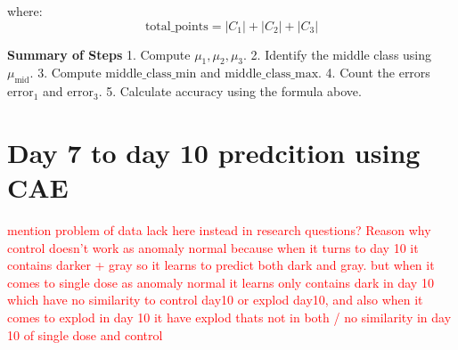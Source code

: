 where:
\[
\text{total\_points} = |C_1| + |C_2| + |C_3|
\]

\textbf{Summary of Steps}
1. Compute \( \mu_1, \mu_2, \mu_3 \).
2. Identify the middle class using \( \mu_{\text{mid}} \).
3. Compute \( \text{middle\_class\_min} \) and \( \text{middle\_class\_max} \).
4. Count the errors \( \text{error}_1 \) and \( \text{error}_3 \).
5. Calculate accuracy using the formula above.

\section{Day 7 to day 10 predcition using CAE} \label{subsec:day7-to-day10}


\textcolor{red}{mention problem of data lack here instead in research questions?}
\textcolor{red}{Reason why control doesn't work as anomaly normal because when it turns to day 10 it contains darker + gray so it learns to predict both dark and gray. but when it comes to single dose as anomaly normal it learns only contains dark in day 10 which have no similarity to control day10 or explod day10, and also when it comes to explod in day 10 it have explod thats not in both / no similarity in day 10 of single dose and control}

